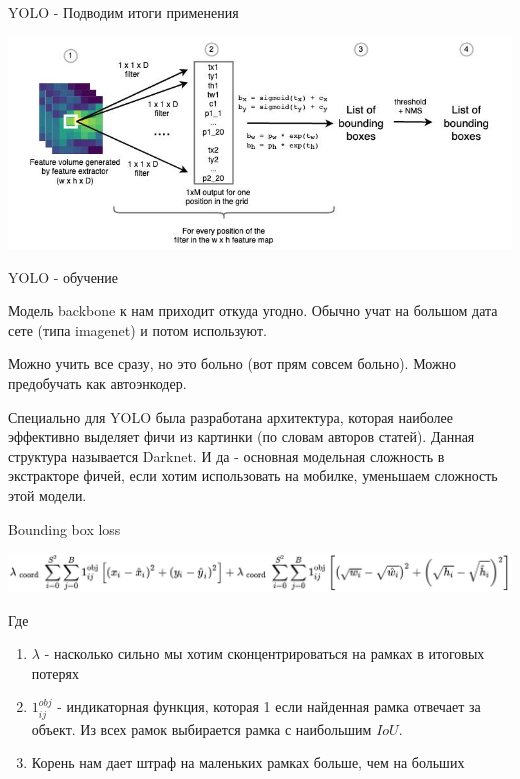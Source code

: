 \documentclass[notes,12pt, aspectratio=169]{beamer}
\begin{document}
\begin{frame}{YOLO - Подводим итоги применения}


\begin{center}
 \includegraphics[width=1\linewidth]{final_interfece.jpg}
\end{center}

\end{frame}


\begin{frame}{YOLO - обучение}

Модель backbone  к нам приходит откуда угодно. Обычно учат на большом дата сете (типа imagenet) и потом используют. 

Можно учить все сразу, но это больно (вот прям совсем больно). Можно предобучать как автоэнкодер.

Специально для YOLO была разработана архитектура, которая наиболее эффективно выделяет фичи из картинки (по словам авторов статей). Данная структура называется Darknet. И да - основная модельная сложность в экстракторе фичей, если хотим использовать на мобилке, уменьшаем сложность этой модели.

\end{frame}

\begin{frame}{Bounding box loss}
\begin{center}
 \includegraphics[width=1\linewidth]{bounding_box_loss.jpg}
\end{center}

Где
 \begin{enumerate}
	\item $\lambda$ - насколько сильно мы хотим сконцентрироваться на рамках в итоговых потерях
	\item $1^{obj}_{ij}$ - индикаторная функция, которая 1 если найденная рамка отвечает за объект. Из всех рамок выбирается рамка с наибольшим $IoU$.
	\item Корень нам дает штраф на маленьких рамках больше, чем на больших
\end{enumerate}
\end{frame}
\end{document}
